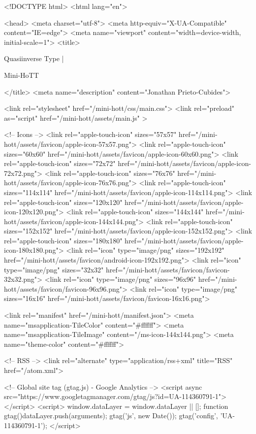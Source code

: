 <!DOCTYPE html>
<html lang="en">

<head>
  <meta charset="utf-8">
  <meta http-equiv="X-UA-Compatible" content="IE=edge">
  <meta name="viewport" content="width=device-width, initial-scale=1">
  <title>
    
      
        Quasiinverse Type |
      
        Mini-HoTT
    
  </title>
  <meta name="description" content="Jonathan Prieto-Cubides">

  <link rel="stylesheet" href="/mini-hott/css/main.css">
  <link rel="preload" as="script" href="/mini-hott/assets/main.js" >

  <!-- Icons -->
  <link rel="apple-touch-icon" sizes="57x57" href="/mini-hott/assets/favicon/apple-icon-57x57.png">
  <link rel="apple-touch-icon" sizes="60x60" href="/mini-hott/assets/favicon/apple-icon-60x60.png">
  <link rel="apple-touch-icon" sizes="72x72" href="/mini-hott/assets/favicon/apple-icon-72x72.png">
  <link rel="apple-touch-icon" sizes="76x76" href="/mini-hott/assets/favicon/apple-icon-76x76.png">
  <link rel="apple-touch-icon" sizes="114x114" href="/mini-hott/assets/favicon/apple-icon-114x114.png">
  <link rel="apple-touch-icon" sizes="120x120" href="/mini-hott/assets/favicon/apple-icon-120x120.png">
  <link rel="apple-touch-icon" sizes="144x144" href="/mini-hott/assets/favicon/apple-icon-144x144.png">
  <link rel="apple-touch-icon" sizes="152x152" href="/mini-hott/assets/favicon/apple-icon-152x152.png">
  <link rel="apple-touch-icon" sizes="180x180" href="/mini-hott/assets/favicon/apple-icon-180x180.png">
  <link rel="icon" type="image/png" sizes="192x192"  href="/mini-hott/assets/favicon/android-icon-192x192.png">
  <link rel="icon" type="image/png" sizes="32x32" href="/mini-hott/assets/favicon/favicon-32x32.png">
  <link rel="icon" type="image/png" sizes="96x96" href="/mini-hott/assets/favicon/favicon-96x96.png">
  <link rel="icon" type="image/png" sizes="16x16" href="/mini-hott/assets/favicon/favicon-16x16.png">

  <link rel="manifest" href="/mini-hott/manifest.json">
  <meta name="msapplication-TileColor" content="#ffffff">
  <meta name="msapplication-TileImage" content="/ms-icon-144x144.png">
  <meta name="theme-color" content="#ffffff">

  <!-- RSS -->
  <link rel="alternate" type="application/rss+xml" title="RSS" href="/atom.xml">

  <!-- Global site tag (gtag.js) - Google Analytics -->
  <script async src="https://www.googletagmanager.com/gtag/js?id=UA-114360791-1"></script>
  <script>
    window.dataLayer = window.dataLayer || [];
    function gtag(){dataLayer.push(arguments);}
    gtag('js', new Date());
    gtag('config', 'UA-114360791-1');
  </script>

